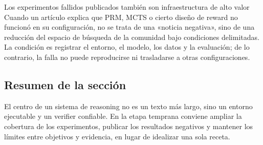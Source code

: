 \begin{warningbox}{Los experimentos fallidos publicados también son infraestructura de alto valor}
Cuando un artículo explica que PRM, MCTS o cierto diseño de reward no funcionó en su configuración, no se trata de una «noticia negativa», sino de una reducción del espacio de búsqueda de la comunidad bajo condiciones delimitadas. La condición es registrar el entorno, el modelo, los datos y la evaluación; de lo contrario, la falla no puede reproducirse ni trasladarse a otras configuraciones.
\end{warningbox}


\subsection{Resumen de la sección}

El centro de un sistema de reasoning no es un texto más largo, sino un entorno ejecutable y un verifier confiable. En la etapa temprana conviene ampliar la cobertura de los experimentos, publicar los resultados negativos y mantener los límites entre objetivos y evidencia, en lugar de idealizar una sola receta.

